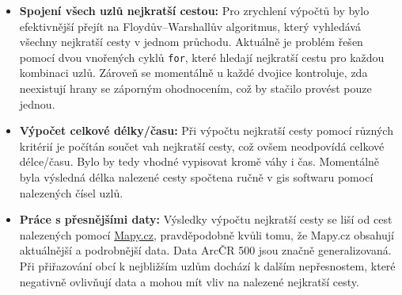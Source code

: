 \begin{itemize}
    \item \textbf{Spojení všech uzlů nejkratší cestou:} Pro zrychlení výpočtů by bylo efektivnější přejít na Floydův–Warshallův algoritmus, který vyhledává všechny nejkratší cesty v jednom průchodu. Aktuálně je problém řešen pomocí dvou vnořených cyklů \texttt{for}, které hledají nejkratší cestu pro každou kombinaci uzlů. Zároveň se momentálně u každé dvojice kontroluje, zda neexistují hrany se záporným ohodnocením, což by stačilo provést pouze jednou.
    \item  \textbf{Výpočet celkové délky/času:} Při výpočtu nejkratší cesty pomocí různých kritérií je počítán součet vah nejkratší cesty, což ovšem neodpovídá celkové délce/času. Bylo by tedy vhodné vypisovat kromě váhy i čas. Momentálně byla výsledná délka nalezené cesty spočtena ručně v gis softwaru pomocí nalezených čísel uzlů.
    \item  \textbf{Práce s přesnějšími daty:} Výsledky výpočtu nejkratší cesty se liší od cest nalezených pomocí \href{https://mapy.cz/}{Mapy.cz}, pravděpodobně kvůli tomu, že Mapy.cz obsahují aktuálnější a podrobnější data. Data ArcČR 500 jsou značně generalizovaná. Při přiřazování obcí k nejbližším uzlům dochází k dalším nepřesnostem, které negativně ovlivňují data a mohou mít vliv na nalezené nejkratší cesty.
\end{itemize}
\newpage